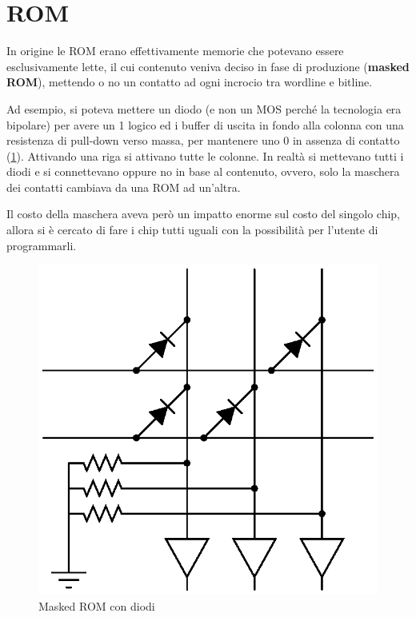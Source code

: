 \documentclass[11pt,4paper]{report}
\begin{document}
\section{ROM}
In origine le ROM erano effettivamente memorie che potevano essere esclusivamente lette, il cui contenuto veniva deciso in fase di produzione (\textbf{masked ROM}), mettendo o no un contatto ad ogni incrocio tra wordline e bitline. 

Ad esempio, si poteva mettere un diodo (e non un MOS perché la tecnologia era bipolare) per avere un 1 logico ed i buffer di uscita in fondo alla colonna con una resistenza di pull-down verso massa, per mantenere uno 0 in assenza di contatto (\ref{fig:masked_rom}). Attivando una riga si attivano tutte le colonne. In realtà si mettevano tutti i diodi e si connettevano oppure no in base al contenuto, ovvero, solo la maschera dei contatti cambiava da una ROM ad un'altra. 

Il costo della maschera aveva però un impatto enorme sul costo del singolo chip, allora si è cercato di fare i chip tutti uguali con la possibilità per l'utente di programmarli.

\begin{figure}[hbtp]
	\centering
	\includegraphics[scale=0.6]{memorie/masked_rom}
	\caption{Masked ROM con diodi}
	\label{fig:masked_rom}
\end{figure}
\end{document}
